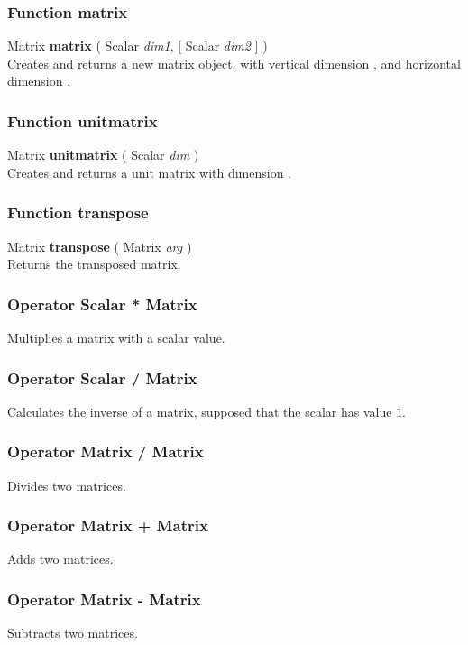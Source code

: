 \subsubsection{Function matrix \label{F:matrix}}
Matrix \textbf{matrix} ( Scalar \textit{dim1},  [ Scalar \textit{dim2} ] ) \\
Creates and returns a new matrix object, with vertical dimension , and horizontal dimension .

\subsubsection{Function unitmatrix \label{F:unitmatrix}}
Matrix \textbf{unitmatrix} ( Scalar \textit{dim} ) \\
Creates and returns a unit matrix with dimension .

\subsubsection{Function transpose \label{F:transpose}}
Matrix \textbf{transpose} ( Matrix \textit{arg} ) \\
Returns the transposed matrix.

\subsubsection{Operator Scalar * Matrix \label{O:Scalar*Matrix}}
Multiplies a matrix with a scalar value.

\subsubsection{Operator Scalar / Matrix \label{O:Scalar/Matrix}}
Calculates the inverse of a matrix, supposed that the scalar has value $1$.

\subsubsection{Operator Matrix / Matrix \label{O:Matrix/Matrix}}
Divides two matrices.

\subsubsection{Operator Matrix + Matrix \label{O:Matrix+Matrix}}
Adds two matrices.

\subsubsection{Operator Matrix - Matrix \label{O:Matrix-Matrix}}
Subtracts two matrices.


